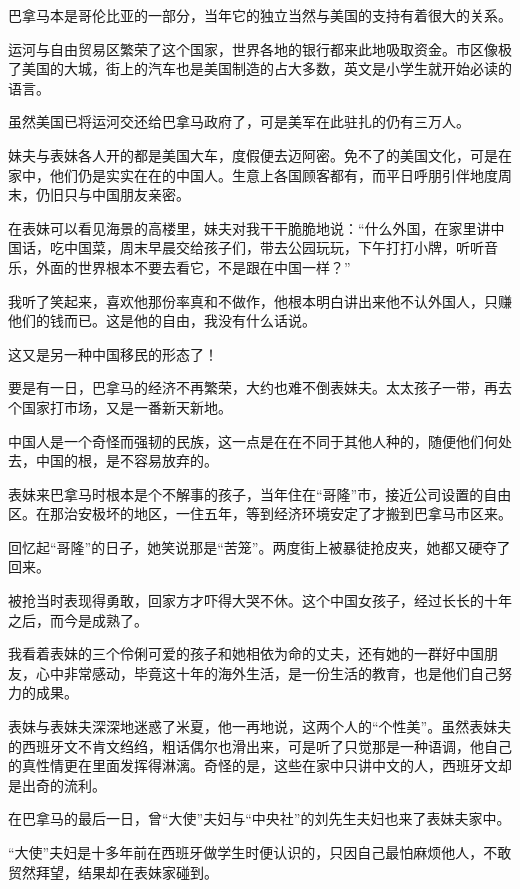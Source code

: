 \par 巴拿马本是哥伦比亚的一部分，当年它的独立当然与美国的支持有着很大的关系。
\par 运河与自由贸易区繁荣了这个国家，世界各地的银行都来此地吸取资金。市区像极了美国的大城，街上的汽车也是美国制造的占大多数，英文是小学生就开始必读的语言。
\par 虽然美国已将运河交还给巴拿马政府了，可是美军在此驻扎的仍有三万人。
\par 妹夫与表妹各人开的都是美国大车，度假便去迈阿密。免不了的美国文化，可是在家中，他们仍是实实在在的中国人。生意上各国顾客都有，而平日呼朋引伴地度周末，仍旧只与中国朋友亲密。
\par 在表妹可以看见海景的高楼里，妹夫对我干干脆脆地说：“什么外国，在家里讲中国话，吃中国菜，周末早晨交给孩子们，带去公园玩玩，下午打打小牌，听听音乐，外面的世界根本不要去看它，不是跟在中国一样？”
\par 我听了笑起来，喜欢他那份率真和不做作，他根本明白讲出来他不认外国人，只赚他们的钱而已。这是他的自由，我没有什么话说。
\par 这又是另一种中国移民的形态了！
\par 要是有一日，巴拿马的经济不再繁荣，大约也难不倒表妹夫。太太孩子一带，再去个国家打市场，又是一番新天新地。
\par 中国人是一个奇怪而强韧的民族，这一点是在在不同于其他人种的，随便他们何处去，中国的根，是不容易放弃的。
\par 表妹来巴拿马时根本是个不解事的孩子，当年住在“哥隆”市，接近公司设置的自由区。在那治安极坏的地区，一住五年，等到经济环境安定了才搬到巴拿马市区来。
\par 回忆起“哥隆”的日子，她笑说那是“苦笼”。两度街上被暴徒抢皮夹，她都又硬夺了回来。
\par 被抢当时表现得勇敢，回家方才吓得大哭不休。这个中国女孩子，经过长长的十年之后，而今是成熟了。
\par 我看着表妹的三个伶俐可爱的孩子和她相依为命的丈夫，还有她的一群好中国朋友，心中非常感动，毕竟这十年的海外生活，是一份生活的教育，也是他们自己努力的成果。
\par 表妹与表妹夫深深地迷惑了米夏，他一再地说，这两个人的“个性美”。虽然表妹夫的西班牙文不肯文绉绉，粗话偶尔也滑出来，可是听了只觉那是一种语调，他自己的真性情更在里面发挥得淋漓。奇怪的是，这些在家中只讲中文的人，西班牙文却是出奇的流利。
\par 在巴拿马的最后一日，曾“大使”夫妇与“中央社”的刘先生夫妇也来了表妹夫家中。
\par “大使”夫妇是十多年前在西班牙做学生时便认识的，只因自己最怕麻烦他人，不敢贸然拜望，结果却在表妹家碰到。
